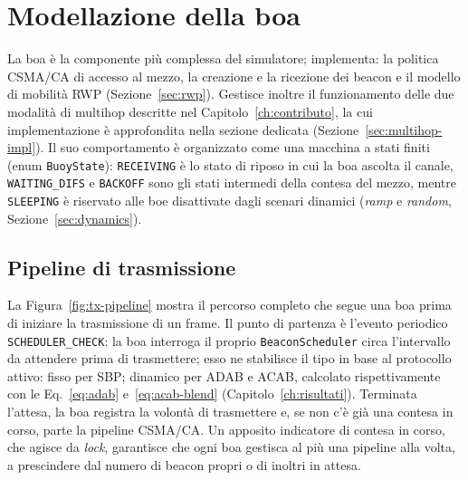 \section{Modellazione della boa}
\label{sec:buoy}
La boa \`e la componente pi\`u complessa del simulatore; implementa: la politica CSMA/CA di
accesso al mezzo, la creazione e la ricezione dei beacon e il modello di mobilit\`a RWP (Sezione~\ref{sec:rwp}).
Gestisce inoltre il funzionamento delle due modalit\`a di multihop descritte nel Capitolo~\ref{ch:contributo}, la cui implementazione \`e
approfondita nella sezione dedicata (Sezione~\ref{sec:multihop-impl}). 
Il suo comportamento \`e organizzato come una macchina a stati finiti
(enum \texttt{BuoyState}): \texttt{RECEIVING} \`e lo stato di riposo in cui la boa
ascolta il canale, \texttt{WAITING\_DIFS} e \texttt{BACKOFF} sono gli stati intermedi
della contesa del mezzo, mentre \texttt{SLEEPING} \`e riservato alle boe disattivate
dagli scenari dinamici (\emph{ramp} e \emph{random}, Sezione~\ref{sec:dynamics}).

\subsection{Pipeline di trasmissione}
\label{sec:txpipeline}
La Figura~\ref{fig:tx-pipeline} mostra il percorso completo che segue una boa prima di iniziare la trasmissione di un frame.
Il punto di partenza \`e l'evento periodico \texttt{SCHEDULER\_CHECK}: la boa interroga
il proprio \texttt{BeaconScheduler} circa l'intervallo da attendere prima di trasmettere; esso ne stabilisce il tipo in base al protocollo attivo: fisso per SBP; dinamico per ADAB e
ACAB, calcolato rispettivamente con le Eq.~\ref{eq:adab} e~\ref{eq:acab-blend} (Capitolo~\ref{ch:risultati}). 
Terminata l'attesa, la boa registra la volont\`a di trasmettere e, se non
c'\`e gi\`a una contesa in corso, parte la pipeline CSMA/CA. Un apposito indicatore
di contesa in corso, che agisce da \emph{lock}, garantisce che ogni boa gestisca al pi\`u una
pipeline alla volta, a prescindere dal numero di beacon propri o di inoltri in attesa.

